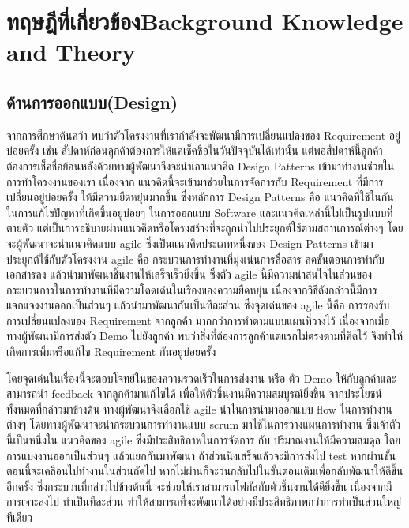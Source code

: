 \chapter{\ifcpe ทฤษฎีที่เกี่ยวข้อง\else Background Knowledge and Theory\fi}


\section{ด้านการออกแบบ(Design)}
จากการศึกษาค้นคว้า พบว่าตัวโครงงานที่เรากำลังจะพัฒนามีการเปลี่ยนแปลงของ Requirement อยู่บ่อยครั้ง เช่น สัปดาห์ก่อนลูกค้าต้องการให้แค่เช็คชื่อในวันปัจจุบันได้เท่านั้น  แต่พอสัปดาห์นี้ลูกค้าต้องการเช็คชื่อย้อนหลังด้วยทางผู้พัฒนาจึงจะนำเอาแนวคิด Design Patterns \cite{designPatterns} เข้ามาทำงานช่วยในการทำโครงงานของเรา เนื่องจาก แนวคิดนี้จะเข้ามาช่วยในการจัดการกับ Requirement ที่มีการเปลี่ยนอยู่บ่อยครั้ง ให้มีความยืดหยุ่นมากขึ้น
ซึ่งหลักการ Design Patterns คือ แนวคิดที่ใช้ในกันในการแก้ไขปัญหาที่เกิดขึ้นอยู่บ่อยๆ ในการออกแบบ Software และแนวคิดเหล่านี้ไม่เป็นรูปแบบที่ตายตัว แต่เป็นการอธิบายผ่านแนวคิดหรือโครงสร้างที่จะถูกนำไปประยุกต์ใช้ตามสถานการณ์ต่างๆ  
โดยจะผู้พัฒนาจะนำแนวคิดแบบ agile \cite{agile}  ซึ่งเป็นแนวคิดประเภทหนึ่งของ Design Patterns เข้ามาประยุกต์ใช้กับตัวโครงงาน agile คือ กระบวนการทำงานที่มุ่งเน้นการสื่อสาร ลดขั้นตอนการทำกับเอกสารลง แล้วนำมาพัฒนาชิ้นงานให้เสร็จเร็วยิ่งขึ้น  ซึ่งตัว agile นี้มีความน่าสนใจในส่วนของกระบวนการในการทำงานที่มีความโดดเด่นในเรื่องของความยืดหยุ่น  เนื่องจากวิธีดังกล่าวนี้มีการแจกแจงงานออกเป็นส่วนๆ  แล้วนำมาพัฒนากันเป็นทีละส่วน  
ซึ่งจุดเด่นของ agile นี้คือ การรองรับการเปลี่ยนแปลงของ Requirement จากลูกค้า มากกว่าการทำตามแบบแผนที่วางไว้  เนื่องจากเมื่อทางผู้พัฒนามีการส่งตัว Demo ไปยังลูกค้า  พบว่าสิ่งที่ต้องการลูกค้าแต่แรกไม่ตรงตามที่คิดไว้  จึงทำให้เกิดการเพิ่มหรือแก้ไข Requirement กันอยู่บ่อยครั้ง

โดยจุดเด่นในเรื่องนี้จะตอบโจทย์ในของความรวดเร็วในการส่งงาน หรือ ตัว Demo ให้กับลูกค้าและ  สามารถนำ feedback จากลูกค้ามาแก้ไขได้ เพื่อให้ตัวชิ้นงานมีความสมบูรณ์ยิ่งขึ้น 
 จากประโยชน์ทั้งหมดที่กล่าวมาข้างต้น ทางผู้พัฒนาจึงเลือกใช้ agile นำในการนำมาออกแบบ flow ในการทำงานต่างๆ  โดยทางผู้พัฒนาจะนำกระบวนการทำงานแบบ scrum \cite{srcum} มาใช้ในการวางแผนการทำงาน 
ซึ่งเจ้าตัวนี้เป็นหนึ่งใน แนวคิดของ agile ซึ่งมีประสิทธิภาพในการจัดการ กับ ปริมาณงานให้มีความสมดุล  โดยการแบ่งงานออกเป็นส่วนๆ แล้วแยกกันมาพัฒนา  ถ้าส่วนนึงเสร็จแล้วจะมีการส่งไป test  หากผ่านขั้นตอนนี้จะเคลื่อนไปทำงานในส่วนถัดไป  หากไม่ผ่านก็จะวนกลับไปในขั้นตอนเดิมเพื่อกลับพัฒนาให้ดีขึ้นอีกครั้ง ซึ่งกระบวนที่กล่าวไปข้างต้นนี้  จะช่วยให้เราสามารถโฟกัสกับตัวชิ้นงานได้ดียิ่งขึ้น เนื่องจากมีการเจาะลงไป ทำเป็นทีละส่วน ทำให้สามารถที่จะพัฒนาได้อย่างมีประสิทธิภาพกว่าการทำเป็นส่วนใหญ่ทีเดียว


